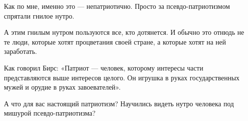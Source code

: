 Как по мне, именно это --- непатриотично.  Просто за псевдо-патриотизмом спрятали гнилое нутро.

А этим гнилым нутром пользуются все, кто дотянется. И обычно это отнюдь не те
люди, которые хотят процветания своей стране, а которые хотят на ней
заработать. 

Как говорил Бирс: «Патриот --- человек, которому интересы части представляются
выше интересов целого. Он игрушка в руках государственных мужей и орудие в
руках завоевателей».

А что для вас настоящий патриотизм? Научились видеть нутро человека под мишурой псевдо-патриотизма?

